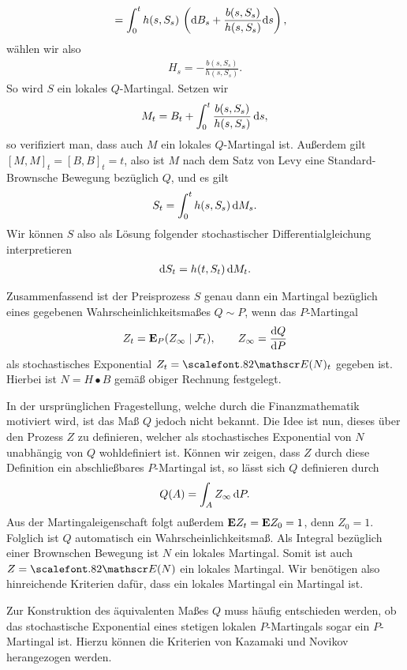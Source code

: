 \begin{ex}
\begin{align*}
&= \int_0^t h(s,S_s)\, \left(\mathrm{d} B_s + \frac{b(s,S_s)}{h(s,S_s)}\mathrm{d} s\right),
\end{align*}
wählen wir also
\begin{align*}
H_s = -\frac{b(s,S_s)}{h(s,S_s)}.
\end{align*}
So wird $S$ ein lokales $Q$-Martingal. Setzen wir
\begin{align*}
M_t = B_t + \int_0^t \frac{b(s,S_s)}{h(s,S_s)}\,\mathrm{d} s,
\end{align*}
so verifiziert man, dass auch $M$ ein lokales $Q$-Martingal ist. Außerdem
gilt $[M,M]_t = [B,B]_t = t$, also ist $M$ nach dem Satz von Levy eine
Standard-Brownsche Bewegung bezüglich $Q$, und es gilt
\begin{align*}
S_t = \int_0^t h(s,S_s)\, \mathrm{d} M_s.
\end{align*}
Wir können $S$ also als Lösung folgender stochastischer Differentialgleichung
interpretieren
\begin{align*}
\mathrm{d} S_t = h(t,S_t)\,\mathrm{d} M_t.
\end{align*}

Zusammenfassend ist der Preisprozess $S$ genau dann ein Martingal bezüglich
eines gegebenen Wahrscheinlichkeitsmaßes $Q\sim P$, wenn das $P$-Martingal
\begin{align*}
Z_t = \mathbf{E}_P(Z_\infty \mid \mathcal{F}_t),\qquad Z_\infty = \frac{\mathrm{d} Q}{\mathrm{d} P}
\end{align*}
als stochastisches Exponential $Z_t = \Ep(N)_t$ gegeben ist. Hierbei ist
$N=H\bullet B$ gemäß obiger Rechnung festgelegt. 

In der ursprünglichen Fragestellung, welche durch die Finanzmathematik motiviert
wird, ist das Maß $Q$ jedoch nicht bekannt. Die Idee ist nun, dieses über den
Prozess $Z$ zu definieren, welcher als stochastisches Exponential von $N$
unabhängig von $Q$ wohldefiniert ist. Können wir zeigen, dass $Z$ durch diese
Definition ein abschließbares $P$-Martingal ist, so lässt sich $Q$ definieren
durch
\begin{align*}
Q(A) = \int_A Z_\infty\,\mathrm{d} P.
\end{align*}
Aus der Martingaleigenschaft folgt außerdem $\mathbf{E} Z_t = \mathbf{E} Z_0 = 1$, denn $Z_0
=1$. Folglich ist $Q$ automatisch ein Wahrscheinlichkeitsmaß. Als Integral
bezüglich einer Brownschen Bewegung ist $N$ ein lokales Martingal. Somit ist
auch $Z = \Ep(N)$ ein lokales Martingal. Wir benötigen also hinreichende
Kriterien dafür, dass ein lokales Martingal ein Martingal ist.\bsp
\end{ex}

Zur Konstruktion des äquivalenten Maßes $Q$ muss häufig entschieden werden, ob
das stochastische Exponential eines stetigen lokalen $P$-Martingals sogar ein
$P$-Martingal ist. Hierzu können die Kriterien von Kazamaki und Novikov
herangezogen werden.

